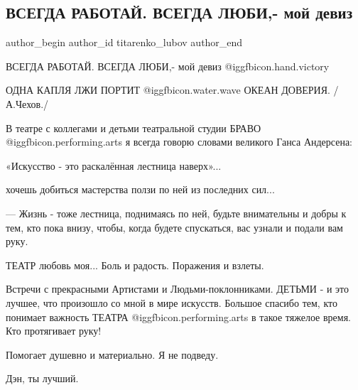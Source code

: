  
 
 
 
 
 
\subsection{ВСЕГДА РАБОТАЙ. ВСЕГДА ЛЮБИ,- мой девиз}
\label{sec:13_11_2021.fb.titarenko_lubov.1.vsegda_rabotaj_vsegda_ljubi}
 
\ifcmt
 author_begin
   author_id titarenko_lubov
 author_end
\fi

ВСЕГДА РАБОТАЙ. ВСЕГДА ЛЮБИ,- мой девиз @igg{fbicon.hand.victory}

ОДНА КАПЛЯ ЛЖИ  ПОРТИТ   @igg{fbicon.water.wave}  ОКЕАН ДОВЕРИЯ. / А.Чехов./

В театре  с коллегами и детьми театральной студии БРАВО  @igg{fbicon.performing.arts}  
я всегда говорю словами  великого  Ганса Андерсена:

«Искусство - это раскалённая лестница наверх»...  

хочешь добиться мастерства ползи по ней из последних сил...  


— Жизнь - тоже лестница, поднимаясь по ней, будьте внимательны и добры к тем,
кто пока внизу,  чтобы, когда  будете  спускаться, вас узнали  и подали  вам
руку.

ТЕАТР любовь моя...  Боль и радость. Поражения и взлеты. 

Встречи с прекрасными Артистами и Людьми-поклонниками. 
ДЕТЬМИ - и это лучшее, что произошло со мной в мире искусств.
Большое спасибо тем, кто понимает важность ТЕАТРА  @igg{fbicon.performing.arts} 
в такое тяжелое время. Кто протягивает руку! 

Помогает душевно и материально. Я не подведу.  

Дэн, ты лучший. 


